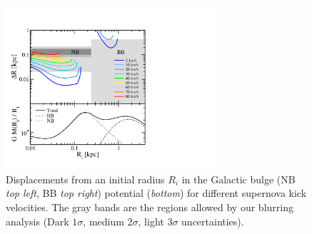 \documentclass[doublespace,nopageskip]{VTthesis} %
\begin{document}
\begin{figure}[htb]
	\centering
	\includegraphics[width=0.7\textwidth,trim=0.20in 0.55in 3.7in 1.2in,clip=true]{Figures/511keV/Fig_bulgeblur_total_2.pdf}%
	\caption{Displacements from an initial radius $R_i$ in the Galactic bulge (NB \textit{top left}, BB \textit{top right}) potential (\textit{bottom}) for different supernova kick velocities. The gray bands are the regions allowed by our blurring analysis (Dark $1\sigma$, medium $2\sigma$, light $3\sigma$ uncertainties).}%
	\label{fig:kicks}%
\end{figure}
\end{document}
